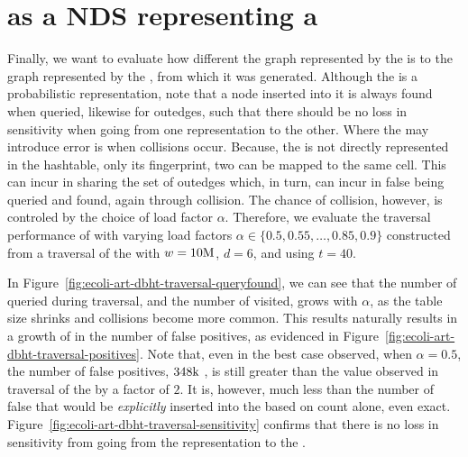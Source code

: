 \section{\dBHT as a NDS representing a \dBG}
\label{sec:results-dbht}

Finally, we want to evaluate how different the graph represented by the \dBHT is to the graph represented by the \dBCM, from which it was generated. Although the \dBHT is a probabilistic representation, note that a node inserted into it is always found when queried, likewise for outedges, such that there should be no loss in sensitivity when going from one representation to the other. Where the \dBHT may introduce error is when collisions occur. Because, the \kmer is not directly represented in the hashtable, only its fingerprint, two  can be mapped to the same cell. This can incur in  sharing the set of outedges which, in turn, can incur in false  being queried and found, again through collision. The chance of collision, however, is controled by the choice of load factor $\alpha$. Therefore, we evaluate the traversal performance of  with varying load factors $\alpha \in \{0.5, 0.55, \ldots, 0.85, 0.9\}$ constructed from a traversal of the \dBCM with $w = 10\mega$, $d = 6$, and using $t = 40$. 

In Figure~\ref{fig:ecoli-art-dbht-traversal-queryfound}, we can see that the number of  queried during traversal, and  the number of  visited, grows with $\alpha$, as the table size shrinks and collisions become more common. This results naturally results in a growth of in the number of false positives, as evidenced in Figure~\ref{fig:ecoli-art-dbht-traversal-positives}. Note that, even in the best case observed, when $\alpha = 0.5$, the number of false positives, $348\kilo$ , is still greater than the value observed in traversal of the \dBCM by a factor of $2$. It is, however, much less than the number of false  that would be \emph{explicitly} inserted into the \dBHT based on count alone, even exact. Figure~\ref{fig:ecoli-art-dbht-traversal-sensitivity} confirms that there is no loss in sensitivity from going from the \dBCM representation to the \dBHT.

